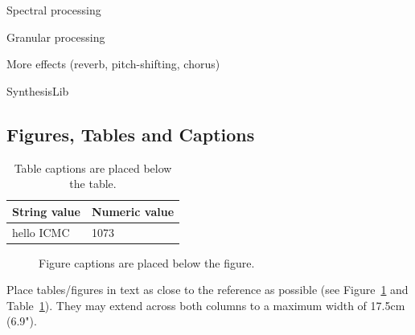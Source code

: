 \documentclass[twoside,10pt]{article}
\begin{document}
Spectral processing

Granular processing

More effects (reverb, pitch-shifting, chorus)

SynthesisLib



\subsection{Figures, Tables and Captions}

\begin{table}[htbp]
\begin{center}
\begin{tabular}{|l|l|}
\hline
String value & Numeric value \\
\hline
hello ICMC  & 1073 \\
\hline
\end{tabular}
\end{center}
\caption{Table captions are placed below the table.}
\label{tab:example}
\end{table}

\begin{figure}[htbp]
\centerline{}
\caption{Figure captions are placed below the figure.}
\label{fig:example}
\end{figure}
Place tables/figures in text as close to the reference as possible
(see Figure~\ref{fig:example} and Table~\ref{tab:example}). They may extend
across both columns to a maximum width of 17.5cm (6.9").



\end{document}
